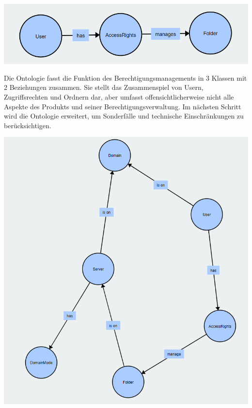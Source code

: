 \begin{center}
    \includegraphics[width=1\textwidth]{Thesis/Images/OntologySmall.png}        
\end{center}

Die Ontologie fasst die Funktion des Berechtigungsmanagements in 3 Klassen mit 2 Beziehungen zusammen. Sie stellt das Zusammenspiel von Usern, Zugriffsrechten und Ordnern dar, aber umfasst offensichtlicherweise nicht alle Aspekte des Produkts und seiner Berechtigungsverwaltung. Im nächsten Schritt wird die Ontologie erweitert, um Sonderfälle und technische Einschränkungen zu berücksichtigen.\\

\begin{center}
    \includegraphics[width=1\textwidth]{Thesis/Images/OntologyBig.png}
\end{center}

